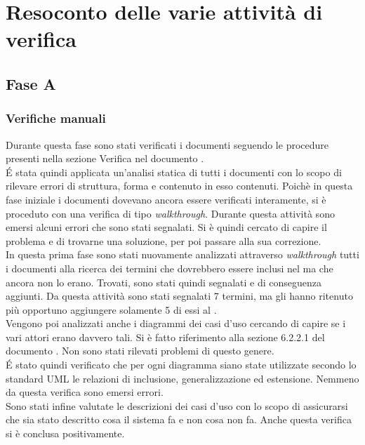 \section{Resoconto delle varie attività di verifica}
		\subsection{Fase A}
			\subsubsection{Verifiche manuali}
			Durante questa fase sono stati verificati i documenti seguendo le procedure presenti nella sezione Verifica nel documento .\\
			É stata quindi applicata un'analisi  statica di tutti i documenti con lo scopo di rilevare errori di struttura, forma e contenuto in esso contenuti. Poichè in questa fase iniziale i documenti dovevano ancora essere verificati interamente, si è proceduto con una verifica di tipo \textit{walkthrough}. Durante questa attività sono emersi alcuni errori che sono stati segnalati. Si è quindi cercato di capire il problema e di trovarne una soluzione, per poi passare alla sua correzione.\\ %
			In questa prima fase sono stati nuovamente analizzati attraverso \textit{walkthrough} tutti i documenti alla ricerca dei termini che dovrebbero essere inclusi nel  ma che ancora non lo erano. Trovati, sono stati quindi segnalati e di conseguenza aggiunti. Da questa attività sono stati segnalati 7 termini, ma gli  hanno ritenuto più opportuno aggiungere solamente 5 di essi al  .\\
			Vengono poi analizzati anche i diagrammi dei casi d'uso cercando di capire se i vari attori erano davvero tali. Si è fatto riferimento alla sezione 6.2.2.1 del documento . Non sono stati rilevati problemi di questo genere.\\
			É stato quindi verificato che per ogni diagramma siano state utilizzate secondo lo standard UML le relazioni di inclusione, generalizzazione ed estensione. Nemmeno da questa verifica sono emersi errori.\\
			Sono stati infine valutate le descrizioni dei casi d'uso con lo scopo di assicurarsi che sia stato descritto cosa il sistema fa e non cosa non fa. Anche questa verifica si è conclusa positivamente.
